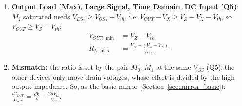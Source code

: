 \begin{enumerate}
      as a current input should have.
  \item \textbf{Output Load (Max), Large Signal, Time Domain, DC Input (Q5)}:
    \(M_2\) saturated needs \(V_{DS_2} \geq V_{GS_2} - V_{th}\), i.e.
    \(V_{OUT} - V_X \geq V_Z - V_X - V_{th}\), so \(V_{OUT} \geq V_Z - V_{th}\):
    \begin{align*}
      V_{OUT,\min} &= V_Z - V_{th} \\
      R_{L,\max} &= \frac{V_{cc} - (V_Z - V_{th})}{I_{OUT}}
    \end{align*}
  \item \textbf{Mismatch:} the ratio is set by the pair \(M_0\), \(M_1\) at the same \(V_{GS}\) (Q5); the other devices only
    move drain voltages, whose effect is divided by the high output impedance. So, as the basic mirror
    (Section~\ref{sec:mirror_basic}): \(\frac{dI_{OUT}}{I_{OUT}} = \frac{dk}{k} - \frac{2dV_{th}}{V_{ov}}\).
\end{enumerate}

